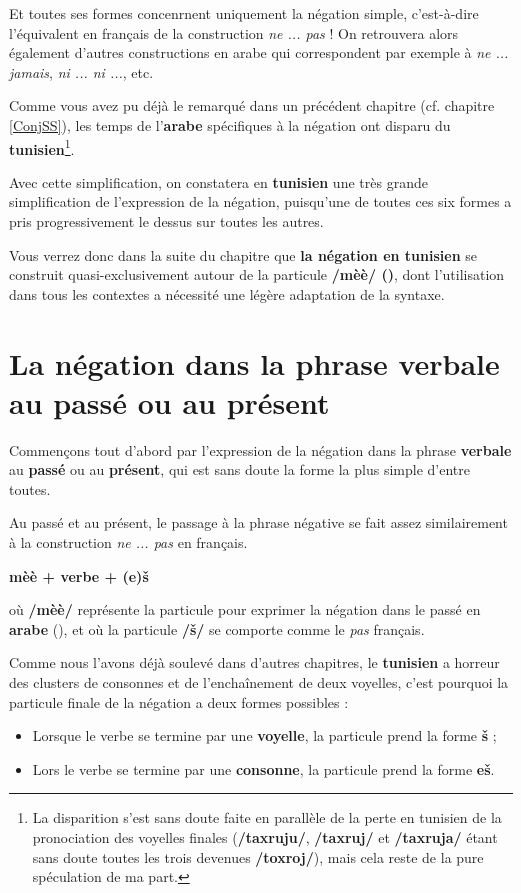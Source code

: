Et toutes ses formes concenrnent uniquement la négation simple, c'est-à-dire l'équivalent en français de la construction \textit{ne ... pas} ! On retrouvera alors également d'autres constructions en arabe qui correspondent par exemple à \textit{ne ... jamais}, \textit{ni ... ni ...}, etc.

Comme vous avez pu déjà le remarqué dans un précédent chapitre (cf. chapitre \ref{ConjSS}), les temps de l'\textbf{arabe} spécifiques à la négation ont disparu du \textbf{tunisien}\footnote{La disparition s'est sans doute faite en parallèle de la perte en tunisien de la pronociation des voyelles finales (\textbf{/taxruju/}, \textbf{/taxruj/} et \textbf{/taxruja/} étant sans doute toutes les trois devenues \textbf{/toxroj/}), mais cela reste de la pure spéculation de ma part.}. 

Avec cette simplification, on constatera en \textbf{tunisien} une très grande simplification de l'expression de la négation, puisqu'une de toutes ces six formes a pris progressivement le dessus sur toutes les autres.

Vous verrez donc dans la suite du chapitre que \textbf{la négation en tunisien} se construit quasi-exclusivement autour de la particule \textbf{/mèè/ ()}, dont  l'utilisation dans tous les contextes a nécessité une légère adaptation de la syntaxe.

\section{La négation dans la phrase verbale au passé ou au présent}
Commençons tout d'abord par l'expression de la négation dans la phrase \textbf{verbale} au \textbf{passé} ou au \textbf{présent}, qui est sans doute la forme la plus simple d'entre toutes. 

Au passé et au présent, le passage à la phrase négative se fait assez similairement à la construction \textit{ne ... pas} en français. 

\begin{center}
    \textbf{\Large mèè + verbe + (e)\v{s}}
\end{center}

où \textbf{/mèè/} représente la particule pour exprimer la négation dans le passé en \textbf{arabe} (), et où la particule \textbf{/\v{s}/} se comporte comme le \textit{pas} français.

Comme nous l'avons déjà soulevé dans d'autres chapitres, le \textbf{tunisien} a horreur des clusters de consonnes et de l'enchaînement de deux voyelles, c'est pourquoi la particule finale de la négation a deux formes possibles : 
\begin{itemize}
    \item Lorsque le verbe se termine par une \textbf{voyelle}, la particule prend la forme \textbf{\v{s}} ; 
    \item Lors le verbe se termine par une \textbf{consonne}, la particule prend la forme \textbf{e\v{s}}.
\end{itemize}

